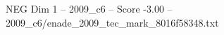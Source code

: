 \begin{textsample}{NEG Dim 1 – 2009\_c6 – Score -3.00 – 2009\_c6/enade\_2009\_tec\_mark\_8016f58348.txt}
\end{textsample}
